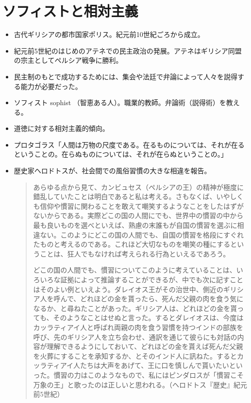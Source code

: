 \documentclass{jsarticle}
\begin{document}
\section{ソフィストと相対主義}


\begin{itemize}


\item 古代ギリシアの都市国家ポリス。紀元前10世紀ごろから成立。
\item 紀元前5世紀のはじめのアテネでの民主政治の発展。アテネはギリシア同盟の宗主としてペルシア戦争に勝利。

\item 民主制のもとで成功するためには、集会や法廷で弁論によって人々を説得する能力が必要だった。

\item ソフィスト sophist （智恵ある人）。職業的教師。弁論術（説得術）を教える。

\item 道徳に対する相対主義的傾向。
\item プロタゴラス「人間は万物の尺度である。在るものについては、それが在るということの。在らぬものについては、それが在らぬということの。」

\item 歴史家ヘロドトスが、社会間での風俗習慣の大きな相違を報告。

\begin{quotation}
  \small あらゆる点から見て、カンビュセス（ペルシアの王）の精神が極度に錯乱していたことは明白であると私は考える。さもなくば、いやしくも信仰や慣習に関わることを敢えて嘲笑するようなことをしたはずがないからである。実際どこの国の人間にでも、世界中の慣習の中から最も良いものを選べといえば、熟慮の末誰もが自国の慣習を選ぶに相違ない。このようにどこの国の人間でも、自国の慣習を格段にすぐれたものと考えるのである。これほど大切なものを嘲笑の種にするということは、狂人でもなければ考えられる行為といえるであろう。

  どこの国の人間でも、慣習についてこのように考えていることは、いろいろな証拠によって推論することができるが、中でも次に記すことはそのよい例といえよう。ダレイオス王がその治世中、側近のギリシア人を呼んで、どれほどの金を貰ったら、死んだ父親の肉を食う気になるか、と尋ねたことがあった。ギリシア人は、どれほどの金を貰っても、そのようなことはせぬと言った。するとダレイオスは、今度はカッラティアイ人と呼ばれ両親の肉を食う習慣を持つインドの部族を呼び、先のギリシア人を立ち会わせ、通訳を通じて彼らにも対話の内容が理解できるようにしておいて、どれほどの金を貰えば死んだ父親を火葬にすることを承知するか、とそのインド人に訊ねた。するとカッラティアイ人たちは大声をあげて、王に口を慎しんで貰いたいといった。慣習の力はこのようなもので、私にはピンダロスが「慣習こそ万象の王」と歌ったのは正しいと思われる。（ヘロドトス『歴史』紀元前5世紀）
\end{quotation}



\end{itemize}
\end{document}
